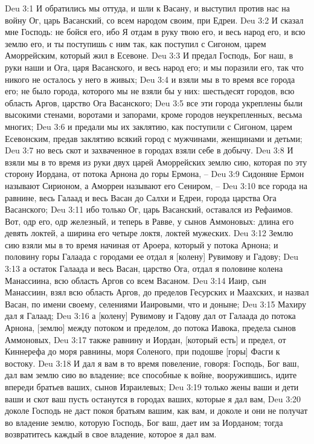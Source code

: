 Deu 3:1  И обратились мы оттуда, и шли к Васану, и выступил против нас на войну Ог, царь Васанский, со всем народом своим, при Едреи.
Deu 3:2  И сказал мне Господь: не бойся его, ибо Я отдам в руку твою его, и весь народ его, и всю землю его, и ты поступишь с ним так, как поступил с Сигоном, царем Аморрейским, который жил в Есевоне.
Deu 3:3  И предал Господь, Бог наш, в руки наши и Ога, царя Васанского, и весь народ его; и мы поразили его, так что никого не осталось у него в живых;
Deu 3:4  и взяли мы в то время все города его; не было города, которого мы не взяли бы у них: шестьдесят городов, всю область Аргов, царство Ога Васанского;
Deu 3:5  все эти города укреплены были высокими стенами, воротами и запорами, кроме городов неукрепленных, весьма многих;
Deu 3:6  и предали мы их заклятию, как поступили с Сигоном, царем Есевонским, предав заклятию всякий город с мужчинами, женщинами и детьми;
Deu 3:7  но весь скот и захваченное в городах взяли себе в добычу.
Deu 3:8  И взяли мы в то время из руки двух царей Аморрейских землю сию, которая по эту сторону Иордана, от потока Арнона до горы Ермона, --
Deu 3:9  Сидоняне Ермон называют Сирионом, а Аморреи называют его Сениром, --
Deu 3:10  все города на равнине, весь Галаад и весь Васан до Салхи и Едреи, города царства Ога Васанского;
Deu 3:11  ибо только Ог, царь Васанский, оставался из Рефаимов. Вот, одр его, одр железный, и теперь в Равве, у сынов Аммоновых: длина его девять локтей, а ширина его четыре локтя, локтей мужеских.
Deu 3:12  Землю сию взяли мы в то время начиная от Ароера, который у потока Арнона; и половину горы Галаада с городами ее отдал я [колену] Рувимову и Гадову;
Deu 3:13  а остаток Галаада и весь Васан, царство Ога, отдал я половине колена Манассиина, всю область Аргов со всем Васаном.
Deu 3:14  Иаир, сын Манассиин, взял всю область Аргов, до пределов Гесурских и Маахских, и назвал Васан, по имени своему, селениями Иаировыми, что и доныне;
Deu 3:15  Махиру дал я Галаад;
Deu 3:16  а [колену] Рувимову и Гадову дал от Галаада до потока Арнона, [землю] между потоком и пределом, до потока Иавока, предела сынов Аммоновых,
Deu 3:17  также равнину и Иордан, [который есть] и предел, от Киннерефа до моря равнины, моря Соленого, при подошве [горы] Фасги к востоку.
Deu 3:18  И дал я вам в то время повеление, говоря: Господь, Бог ваш, дал вам землю сию во владение; все способные к войне, вооружившись, идите впереди братьев ваших, сынов Израилевых;
Deu 3:19  только жены ваши и дети ваши и скот ваш пусть останутся в городах ваших, которые я дал вам,
Deu 3:20  доколе Господь не даст покоя братьям вашим, как вам, и доколе и они не получат во владение землю, которую Господь, Бог ваш, дает им за Иорданом; тогда возвратитесь каждый в свое владение, которое я дал вам.
